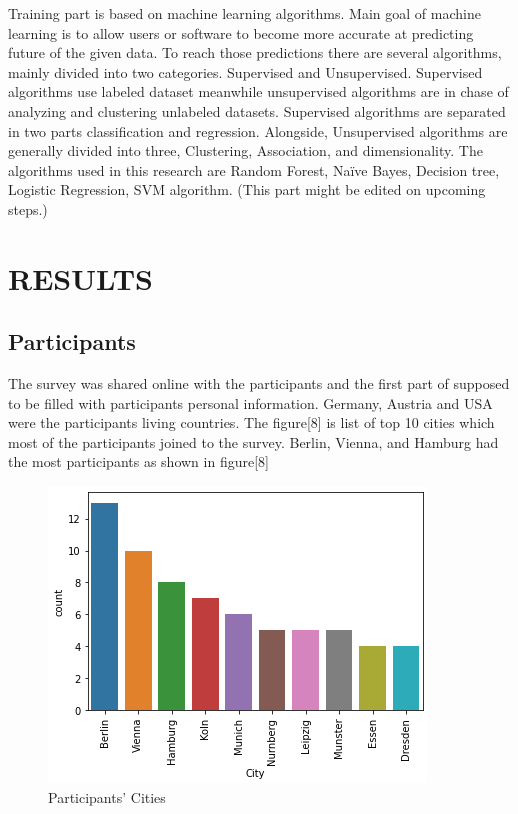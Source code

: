 \documentclass[letterpaper, 10 pt, conference]{ieeeconf}
\begin{document}
Training part is based on machine learning algorithms. Main goal of machine learning is to allow users or software to become more accurate at predicting future of the given data. To reach those predictions there are several algorithms, mainly divided into two categories. Supervised and Unsupervised. Supervised algorithms use labeled dataset meanwhile unsupervised algorithms are in chase of analyzing and clustering unlabeled datasets. Supervised algorithms are separated in two parts classification and regression. Alongside, Unsupervised algorithms are generally divided into three, Clustering, Association, and dimensionality. The algorithms used in this research are Random Forest, Naïve Bayes, Decision tree, Logistic Regression, SVM algorithm. (This part might be edited on upcoming steps.)

\section{RESULTS}

\subsection{Participants}

The survey was shared online with the participants and the first part of supposed to be filled with participants personal information. Germany, Austria and USA were the participants living countries. The figure[8] is list of top 10 cities which most of the participants joined to the survey. Berlin, Vienna, and Hamburg had the most participants as shown in figure[8] \\

\begin{figure}[!ht]
    \centering
    \includegraphics[scale = 0.8]{Picture8.png}
    \caption{Participants' Cities}
\end{figure}
\end{document}
